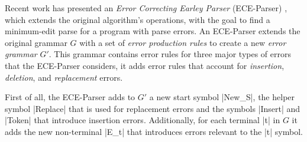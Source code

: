 
%

 Recent work has presented an \emph{Error
Correcting Earley Parser} (ECE-Parser) \citep{Aho_1972}, which extends the
original algorithm's operations, with the goal to find a minimum-edit parse for
a program with parse errors. An ECE-Parser extends the original grammar $G$ with
a set of \emph{error production rules} to create a new \emph{error grammar}
$G'$. This grammar contains error rules for three major types of errors that the
ECE-Parser considers, \ie it adds error rules that account for \emph{insertion},
\emph{deletion}, and \emph{replacement} errors.

First of all, the ECE-Parser adds to $G'$ a new start symbol |New_S|, the helper
symbol |Replace| that is used for replacement errors and the symbols |Insert|
and |Token| that introduce insertion errors. Additionally, for each terminal |t|
in $G$ it adds the new non-terminal |E_t| that introduces errors relevant to the
|t| symbol.

